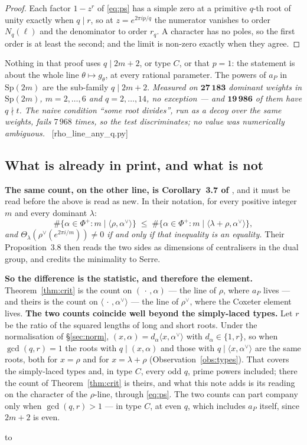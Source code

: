 \documentclass[11pt,a4paper]{article}
\theoremstyle{definition}
\newcommand{\Sp}{\mathrm{Sp}}
\newcommand{\ver}[1]{\unskip\penalty0\ \textcolor{azul}{\small\textsf{[#1]}}}
\newenvironment{keybox}
  {\par\vspace{9pt}\begin{lrbox}{\fichabox}%
   \begin{minipage}{0.90\textwidth}\vspace{7pt}\setlength{\parskip}{3pt}}
  {\vspace{7pt}\end{minipage}\end{lrbox}%
   \par\noindent\hbox to \textwidth{\hfill
   \textcolor{azul}{\rule[-\dp\fichabox]{3.2pt}{\dimexpr\ht\fichabox+\dp\fichabox\relax}}%
   \colorbox{fondoficha}{\usebox{\fichabox}}\hfill}%
   \par\vspace{9pt}}
\begin{document}
\begin{proof}
Each factor $1-z^{r}$ of \eqref{eq:ps} has a simple zero at a primitive $q$-th root of unity exactly
when $q\mid r$, so at $z=e^{2\pi ip/q}$ the numerator vanishes to order $N_q(\ell)$ and the
denominator to order $r_q$. A character has no poles, so the first order is at least the second; and
the limit is non-zero exactly when they agree.
\end{proof}

\noindent Nothing in that proof uses $q\mid 2m+2$, or type $C$, or that $p=1$: the statement is about
the whole line $\theta\mapsto g_\theta$, at every rational parameter. The powers of $a_P$ in
$\Sp(2m)$ are the sub-family $q\mid 2m+2$. \emph{Measured on $\mathbf{27\,183}$ dominant weights in
$\Sp(2m)$, $m=2,\dots,6$ and $q=2,\dots,14$, no exception --- and $\mathbf{19\,986}$ of them have
$q\nmid t$. The naive condition ``some root divides'', run as a decoy over the same weights, fails
$7\,968$ times, so the test discriminates; no value was numerically ambiguous.}
\ver{rho\_line\_any\_q.py}

\subsection*{What is already in print, and what is not}

\begin{keybox}
\textbf{The same count, on the other line, is Corollary~3.7 of \cite{NPP25}}, and it must be read
before the above is read as new. In their notation, for every positive integer $m$ and every
dominant $\lambda$:
\[
\#\{\alpha\in\Phi^+ : m\mid\langle\rho,\alpha^\vee\rangle\}\;\le\;
\#\{\alpha\in\Phi^+ : m\mid\langle\lambda+\rho,\alpha^\vee\rangle\},
\]
\emph{and $\Theta_\lambda(\rho^\vee(e^{2\pi i/m}))\neq0$ if and only if that inequality is an
equality.} Their Proposition~3.8 then reads the two sides as dimensions of centralisers in the dual
group, and credits the minimality to Serre.

\smallskip
\textbf{So the difference is the statistic, and therefore the element.} Theorem~\ref{thm:crit} is
the count on $(\,\cdot\,,\alpha)$ --- the line of $\rho$, where $a_P$ lives --- and theirs is the
count on $\langle\,\cdot\,,\alpha^\vee\rangle$ --- the line of $\rho^\vee$, where the Coxeter element
lives. \textbf{The two counts coincide well beyond the simply-laced types.} Let $r$ be the ratio of
the squared lengths of long and short roots. Under the normalisation of \S\ref{sec:norm},
$(x,\alpha)=d_\alpha\langle x,\alpha^\vee\rangle$ with $d_\alpha\in\{1,r\}$, so when
$\gcd(q,r)=1$ the roots with $q\mid(x,\alpha)$ and those with $q\mid\langle x,\alpha^\vee\rangle$
are the same roots, both for $x=\rho$ and for $x=\lambda+\rho$ (Observation~\ref{obs:types}). That
covers the simply-laced types and, in type $C$, every odd $q$, prime powers included; there the
count of Theorem~\ref{thm:crit} is theirs, and what this note adds is its reading on the character
of the $\rho$-line, through \eqref{eq:ps}. The two counts can part company only when
$\gcd(q,r)>1$ --- in type $C$, at even $q$, which includes $a_P$ itself, since $2m+2$ is even.
\end{keybox}
\end{document}
